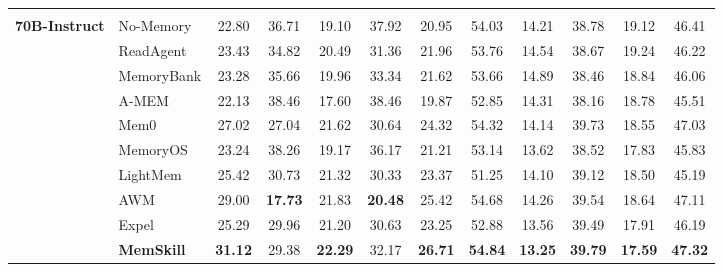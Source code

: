 \begin{table}[t]
\begin{tabular}{>{\centering\arraybackslash}m{0.5cm} l cc cc c | cc cc c}
        \multirow{10}{*}{\rotatebox[origin=c]{90}{\shortstack{\textbf{LLaMA3.3}\\\textbf{70B-Instruct}}}} &
        No-Memory   & 22.80 & 36.71 & 19.10 & 37.92 & 20.95 & 54.03 & 14.21 & 38.78 & 19.12 & 46.41 \\
        & ReadAgent  & 23.43 & 34.82 & 20.49 & 31.36 & 21.96 & 53.76 & 14.54 & 38.67 & 19.24 & 46.22 \\
        & MemoryBank & 23.28 & 35.66 & 19.96 & 33.34 & 21.62 & 53.66 & 14.89 & 38.46 & 18.84 & 46.06 \\
        & A-MEM      & 22.13 & 38.46 & 17.60 & 38.46 & 19.87 & 52.85 & 14.31 & 38.16 & 18.78 & 45.51 \\
        & Mem0       & 27.02 & 27.04 & 21.62 & 30.64 & 24.32 & 54.32 & 14.14 & 39.73 & 18.55 & 47.03 \\
        & MemoryOS   & 23.24 & 38.26 & 19.17 & 36.17 & 21.21 & 53.14 & 13.62 & 38.52 & 17.83 & 45.83 \\
        & LightMem   & 25.42 & 30.73 & 21.32 & 30.33 & 23.37 & 51.25 & 14.10 & 39.12 & 18.50 & 45.19 \\
        & AWM        & 29.00 & \textbf{17.73} & 21.83 & \textbf{20.48} & 25.42 & 54.68 & 14.26 & 39.54 & 18.64 & 47.11 \\
        & Expel      & 25.29 & 29.96 & 21.20 & 30.63 & 23.25 & 52.88 & 13.56 & 39.49 & 17.91 & 46.19 \\
        & \cellcolor{hl-llama}\textbf{MemSkill} &
        \cellcolor{hl-llama}\textbf{31.12} & \cellcolor{hl-llama}29.38 &
        \cellcolor{hl-llama}\textbf{22.29} & \cellcolor{hl-llama}32.17 &
        \cellcolor{hl-llama}\textbf{26.71} &
        \cellcolor{hl-llama}\textbf{54.84} & \cellcolor{hl-llama}\textbf{13.25} &
        \cellcolor{hl-llama}\textbf{39.79} & \cellcolor{hl-llama}\textbf{17.59} &
        \cellcolor{hl-llama}\textbf{47.32} \\
        \midrule


\end{tabular}
\end{table}
